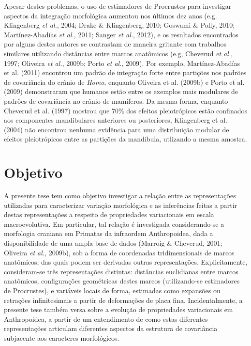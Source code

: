 \documentclass[12pt,twoside]{report}
\begin{document}
Apesar destes problemas, o uso de estimadores de Procrustes para
investigar aspectos da integração morfológica aumentou nos últimos dez
anos (e.g. Klingenberg \emph{et al.}, 2004; Drake \& Klingenberg, 2010;
Goswami \& Polly, 2010; Martínez-Abadías \emph{et al.}, 2011; Sanger
\emph{et al.}, 2012), e os resultados encontrados por alguns destes
autores se contrastam de maneira gritante com trabalhos similares
utilizando distâncias entre marcos anatômicos (e.g, Cheverud \emph{et
al.}, 1997; Oliveira \emph{et al.}, 2009b; Porto \emph{et al.}, 2009).
Por exemplo, Martínez-Abadías et al. (2011) encontrou um padrão de
integração forte entre partições nos padrões de covariância do crânio de
\emph{Homo}, enquanto Oliveira et al. (2009b) e Porto et al. (2009)
demonstraram que humanos estão entre os exemplos mais modulares de
padrões de covariância no crânio de mamíferos. Da mesma forma, enquanto
Cheverud et al. (1997) mostrou que 70\% dos efeitos pleiotrópicos estão
confinados aos componentes mandibulares anteriores ou posteriores,
Klingenberg et al. (2004) não encontrou nenhuma evidência para uma
distribuição modular de efeitos pleiotrópicos entre as partições da
mandíbula, utlizando a mesma amostra.

\section{Objetivo}\label{objetivo}

A presente tese tem como objetivo investigar a relação entre as
representações utilizadas para caracterizar variação morfológica e as
inferências feitas a partir destas representações a respeito de
propriedades variacionais em escala macroevolutiva. Em particular, tal
relação é investigada considerando-se a morfologia craniana em Primatas
da infraordem Anthropoidea, dada a disponibilidade de uma ampla base de
dados (Marroig \& Cheverud, 2001; Oliveira \emph{et al.}, 2009b), sob a
forma de coordenadas tridimensionais de marcos anatômicos, das quais
podem ser derivadas outras representações. Explicitamente, consideram-se
três representações distintas: distâncias euclidianas entre marcos
anatômicos, configurações geométricas destes marcos (utilizando-se
estimadores de Procrustes), e variáveis locais de forma, estimadas como
expansões ou retrações infinitesimais a partir de deformações de placa
fina. Incidentalmente, a presente tese também versa sobre a evolução de
propriedades variacionais em Anthropoidea, a partir de um entendimento
de como estas diferentes representações articulam diferentes aspectos da
estrutura de covariância subjacente aos caracteres morfológicos.
\end{document}

